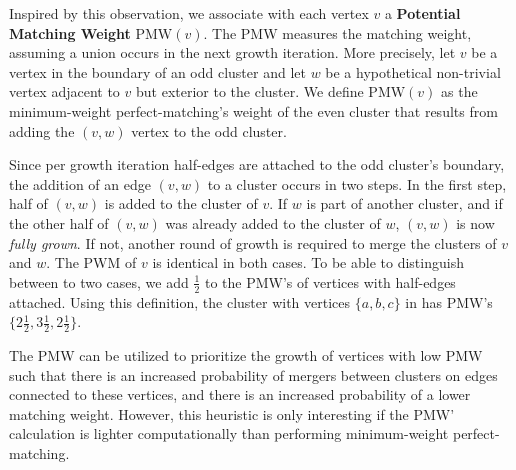 Inspired by this observation, we associate with each vertex $v$ a \textbf{Potential Matching Weight} $\text{PMW}(v)$. The PMW measures the matching weight, assuming a union occurs in the next growth iteration. More precisely,
let $v$ be a vertex in the boundary of an odd cluster and let $w$ be a hypothetical non-trivial vertex adjacent to $v$ but exterior to the cluster. We define $\text{PMW}(v)$ as the minimum-weight perfect-matching's weight of the even cluster that results from adding the $(v,w)$ vertex to the odd cluster. %
    
Since per growth iteration half-edges are attached to the odd cluster's boundary, the addition of an edge $(v,w)$ to a cluster occurs in two steps. In the first step, half of $(v,w)$ is added to the cluster of $v$. If $w$ is part of another cluster, and if the other half of $(v,w)$ was already added to the cluster of $w$, $(v,w)$ is now \emph{fully grown}. If not, another round of growth is required to merge the clusters of $v$ and $w$. The PWM of $v$ is identical in both cases. To be able to distinguish between to two cases, we add $\frac{1}{2}$ to the PMW's of vertices with half-edges attached. Using this definition, the cluster with vertices $\{a,b,c\}$ in  has PMW's $\{2\frac{1}{2}, 3\frac{1}{2}, 2\frac{1}{2}\}$.

The PMW can be utilized to prioritize the growth of vertices with low PMW such that there is an increased probability of mergers between clusters on edges connected to these vertices, and there is an increased probability of a lower matching weight. However, this heuristic is only interesting if the PMW' calculation is lighter computationally than performing minimum-weight perfect-matching. %


